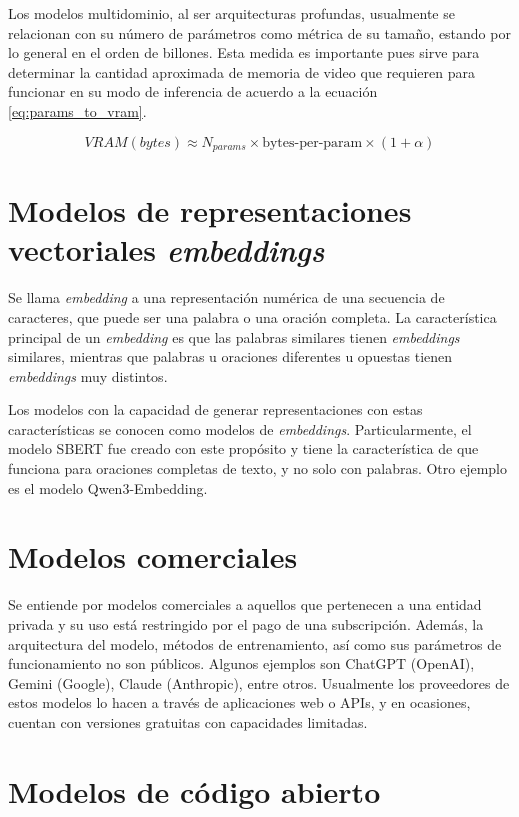 Los modelos multidominio, al ser arquitecturas profundas, usualmente se
relacionan con su número de parámetros como métrica de su tamaño, estando
por lo general en el orden de billones. Esta medida es importante pues
sirve para determinar la cantidad aproximada de memoria de video que requieren
para funcionar en su modo de inferencia de acuerdo a la ecuación
\ref{eq:params_to_vram}.

\begin{equation}\label{eq:params_to_vram}
    VRAM(bytes) \approx N_{params} \times \text{bytes-per-param} \times (1 + \alpha)
\end{equation}

\section{Modelos de representaciones vectoriales \textit{embeddings}}

Se llama \textit{embedding} a una representación numérica de una secuencia de
caracteres, que puede ser una palabra o una oración completa. La característica
principal de un \textit{embedding} es que las palabras similares tienen
\textit{embeddings} similares, mientras que palabras u oraciones diferentes u
opuestas tienen \textit{embeddings} muy distintos.

Los modelos con la capacidad de generar representaciones con estas
características se conocen como modelos de \textit{embeddings}. Particularmente,
el modelo SBERT fue creado con este propósito y tiene la característica de
que funciona para oraciones completas de texto, y no solo con palabras.
Otro ejemplo es el modelo Qwen3-Embedding.

\section{Modelos comerciales}

Se entiende por modelos comerciales a aquellos que pertenecen a una entidad
privada y su uso está restringido por el pago de una subscripción.
Además, la arquitectura del modelo, métodos de entrenamiento, así como sus
parámetros de funcionamiento no son públicos. Algunos ejemplos son ChatGPT
(OpenAI), Gemini (Google), Claude (Anthropic), entre otros. Usualmente los
proveedores de estos modelos lo hacen a través de aplicaciones web o APIs,
y en ocasiones, cuentan con versiones gratuitas con capacidades limitadas.

\section{Modelos de código abierto}

